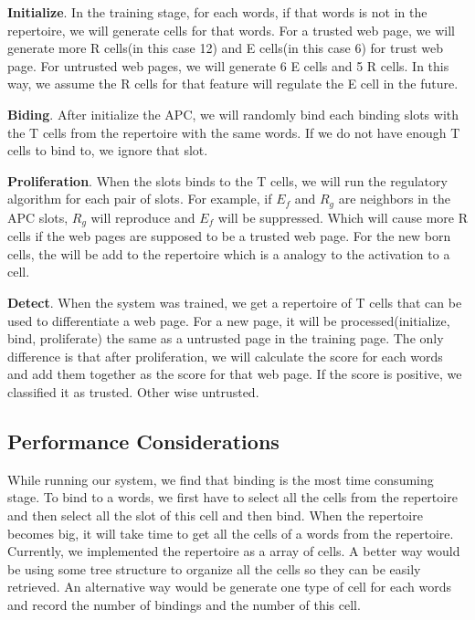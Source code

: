 \documentclass{llncs}
\begin{document}
\textbf{Initialize}. In the training stage, for each words, if that words is not in the repertoire, we will generate cells for that words. For a trusted web page, we will generate more R cells(in this case 12) and E cells(in this case 6) for trust web page. For untrusted web pages, we will generate 6 E cells and 5 R cells. In this way, we assume the R cells for that feature will regulate the E cell in the future. 

\textbf{Biding}. After initialize the APC, we will randomly bind each binding slots with the T cells from the repertoire with the same words. If we do not have enough T cells to bind to, we ignore that slot. 

\textbf{Proliferation}. When the slots binds to the T cells, we will run the regulatory algorithm for each pair of slots. For example, if $E_f$ and $R_g$ are neighbors in the APC slots, $R_g$ will reproduce and $E_f$ will be suppressed. Which will cause more R cells if the web pages are supposed to be a trusted web page. For the new born cells, the will be add to the repertoire which is a analogy to the activation to a cell. 

\textbf{Detect}. When the system was trained, we get a repertoire of T cells that can be used to differentiate a web page. For a new page, it will be processed(initialize, bind, proliferate) the same as a untrusted page in the training page. The only difference is that after proliferation, we will calculate the score for each words and add them together as the score for that web page. If the score is positive, we classified it as trusted. Other wise untrusted. 

\subsection{Performance Considerations}
While running our system, we find that binding is the most time consuming stage. To bind to a words, we first have to select all the cells from the repertoire and then select all the slot of this cell and then bind. When the repertoire becomes big, it will take time to get all the cells of a words from the repertoire. Currently, we implemented the repertoire as a array of cells. A better way would be using some tree structure to organize all the cells so they can be easily retrieved. An alternative way would be generate one type of cell for each words and record the number of bindings and the number of this cell. 
\end{document}
